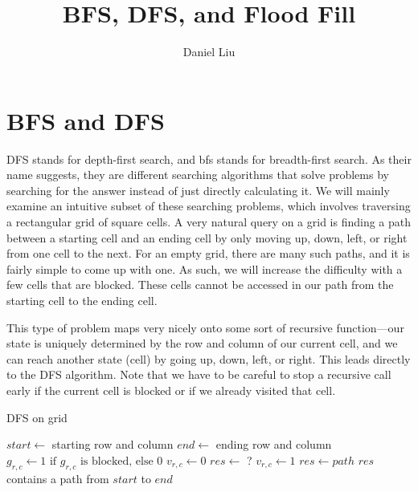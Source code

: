 \documentclass{article}
\title{BFS, DFS, and Flood Fill}
\author{Daniel Liu}
\begin{document}
    \maketitle

    \section{BFS and DFS}
    DFS stands for depth-first search, and bfs stands for breadth-first search. As their name suggests, they are different searching algorithms that solve problems by searching for the answer instead of just directly calculating it. We will mainly examine an intuitive subset of these searching problems, which involves traversing a rectangular grid of square cells. A very natural query on a grid is finding a path between a starting cell and an ending cell by only moving up, down, left, or right from one cell to the next. For an empty grid, there are many such paths, and it is fairly simple to come up with one. As such, we will increase the difficulty with a few cells that are blocked. These cells cannot be accessed in our path from the starting cell to the ending cell.

    This type of problem maps very nicely onto some sort of recursive function---our state is uniquely determined by the row and column of our current cell, and we can reach another state (cell) by going up, down, left, or right. This leads directly to the DFS algorithm. Note that we have to be careful to stop a recursive call early if the current cell is blocked or if we already visited that cell.

    \begin{algorithm}[H]
        \caption{DFS on grid}
        \begin{algorithmic}[1]
            \State $start \gets$ starting row and column
            \State $end \gets$ ending row and column
            \State $g_{r, c} \gets 1 \textrm{ if } g_{r, c} \textrm{ is blocked, else } 0$
            \State $v_{r, c} \gets 0$
            \State $res \gets $ ?
                    \State \Return
                \EndIf
                \State $v_{r, c} \gets 1$
                    \State $res \gets path$
                    \State \Return
                \EndIf
                    \State {}
                \EndFor
            \EndFunction
            \State {}
            \State $res$ contains a path from $start$ to $end$
        \end{algorithmic}
    \end{algorithm}
\end{document}
